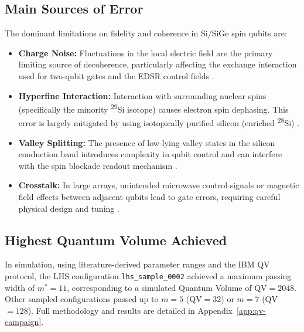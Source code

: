\subsection{Main Sources of Error}
The dominant limitations on fidelity and coherence in Si/SiGe spin qubits are:
\begin{itemize}
    \item \textbf{Charge Noise:} Fluctuations in the local electric field are the primary limiting source of decoherence, particularly affecting the exchange interaction used for two-qubit gates and the EDSR control fields \cite{ref4, ref9}.
    \item \textbf{Hyperfine Interaction:} Interaction with surrounding nuclear spins (specifically the minority \textsuperscript{29}Si isotope) causes electron spin dephasing. This error is largely mitigated by using isotopically purified silicon (enriched \textsuperscript{28}Si) \cite{ref2, ref4, ref9}.
    \item \textbf{Valley Splitting:} The presence of low-lying valley states in the silicon conduction band introduces complexity in qubit control and can interfere with the spin blockade readout mechanism \cite{ref2}.
    \item \textbf{Crosstalk:} In large arrays, unintended microwave control signals or magnetic field effects between adjacent qubits lead to gate errors, requiring careful physical design and tuning \cite{ref3}.
\end{itemize}

\subsection{Highest Quantum Volume Achieved}
In simulation, using literature-derived parameter ranges and the IBM QV protocol, the LHS configuration \texttt{lhs\_sample\_0002} achieved a maximum passing width of $m^*=11$, corresponding to a simulated Quantum Volume of $\mathrm{QV}=2048$. Other sampled configurations passed up to $m=5$ (QV$=32$) or $m=7$ (QV$=128$). Full methodology and results are detailed in Appendix~\ref{app:qv-campaign}.



\clearpage




